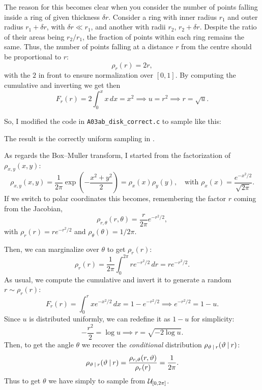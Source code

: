 The reason for this becomes clear when you consider the number of points falling
inside a ring of given thickness $\delta r$. Consider a ring with inner radius
$r_1$ and outer radius $r_1 + \delta r$, with $\delta r \ll r_1$, and another
with radii $r_2$, $r_2 + \delta r$.  Despite the ratio of their areas being $r_2
/ r_1$, the fraction of points within each ring remains the same. Thus, the
number of points falling at a distance $r$ from the centre should be
proportional to $r$:
\begin{equation}
    \rho_{r}(r) = 2r,
\end{equation}
with the $2$ in front to ensure normalization over $[0, 1]$. By computing the
cumulative and inverting we get then
\begin{equation}
    F_r(r) = 2 \int_{0}^{x} x \, dx = x^{2} \implies u = r^{2} \implies r =
    \sqrt{u}.
\end{equation}

So, I modified the code in \texttt{A03ab\_disk\_correct.c} to sample like this:

The result is the correctly uniform sampling in .

As regards the Box–Muller transform, I started from the factorization of
$\rho_{x, y}(x, y)$:
\begin{equation}
    \rho_{x, y}(x, y) = \frac{1}{2\pi} \exp\left(-\frac{x^{2} + y^{2}}{2}\right)
        = \rho_x(x) \rho_y(y), \quad \text{with }
        \rho_x(x) = \frac{e^{-x^{2}/2}}{\sqrt{2\pi}}.
\end{equation}
If we switch to polar coordinates this becomes, remembering the factor $r$
coming from the Jacobian,
\begin{equation}
    \rho_{r, \theta}(r, \theta) = \frac{r}{2\pi} e^{-r^{2}/2},
\end{equation}
with $\rho_r(r) = r e^{-r^{2}/2}$ and $\rho_\theta(\theta) = 1 / 2\pi$.

Then, we can marginalize over $\theta$ to get $\rho_r(r)$:
\begin{equation}
    \rho_r(r) = \frac{1}{2\pi} \int_{0}^{2\pi} r e^{-r^{2}/2} \, dr
        = r e^{-r^{2}/2}.
\end{equation}
As usual, we compute the cumulative and invert it to generate a random $r \sim
\rho_r(r)$:
\begin{equation}
    F_r(r) = \int_{0}^{r} x e^{-x^{2}/2} \, dx = 1 - e^{-r^{2}/2}
    \implies e^{-r^{2}/2} = 1 - u.
\end{equation}
Since $u$ is distributed uniformly, we can redefine it as $1 - u$ for
simplicity:
\begin{equation}
    -\frac{r^{2}}{2} = \log u \implies r = \sqrt{-2\log u}.
\end{equation}
Then, to get the angle $\theta$ we recover the \emph{conditional} distribution
$\rho_{\vartheta\:\vert\: r}(\vartheta \:\vert\: r)$:
\begin{equation}
    \rho_{\vartheta\:\vert\: r}(\vartheta\:\vert\: r)
        = \frac{\rho_{r, \vartheta}(r, \vartheta)}{\rho_{r}(r)} = \frac{1}{2\pi}.
\end{equation}
Thus to get $\theta$ we have simply to sample from $\mathcal{U}_{[0, 2\pi]}$.

